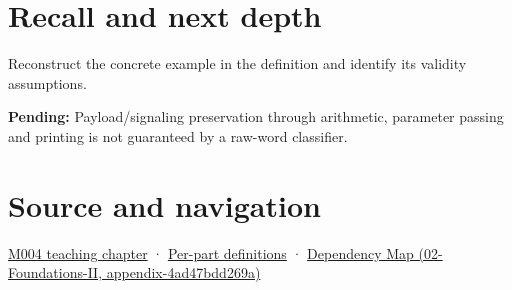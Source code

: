 \section{Recall and next depth}\label{appendix-d6607cc4c235-recall-and-next-depth}

Reconstruct the concrete example in the definition and identify its validity assumptions.

\textbf{Pending:} Payload/signaling preservation through arithmetic, parameter passing and printing is not guaranteed by a raw-word classifier.

\section{Source and navigation}\label{appendix-d6607cc4c235-source-and-navigation}

\href{Continuous\%20Notes/Computing\%20Foundations\%20-\%20From\%20Bits\%20to\%20C++\%20and\%20Systems\%20APIs\#A\%20stretching\%20ruler\%20for\%20real-valued\%20quantities}{M004 teaching chapter} · \hyperref[appendix-fd090d982a15-m004---parts-61-76]{Per-part definitions} · \href{../02-Foundations-II/main.pdf\#nameddest=appendix-4ad47bdd269a}{Dependency Map (02-Foundations-II, appendix-4ad47bdd269a)}
